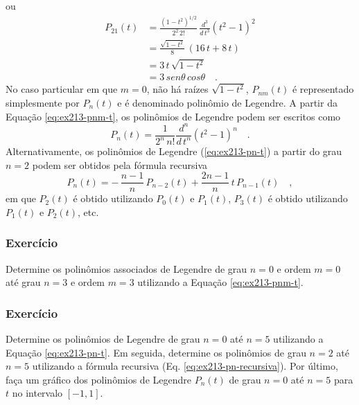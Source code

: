 \documentclass[10pt,a4paper,fleqn]{article}
\begin{document}
ou
\begin{equation}
\begin{split}
P_{21}(t) & = \frac{(1 - t^{2})^{1/2}}{2^{2} \, 2!} \, \frac{d^{3}}{d \, t^{3}}(t^{2} - 1)^{2} \\
& = \frac{\sqrt{1 - t^{2}}}{8} \, (16 \, t + 8 \, t) \\
& = 3 \, t \, \sqrt{1 - t^{2}} \\
& = 3 \, sen \theta \, cos \theta \quad .
\end{split}
\label{eq:ex213-p21-t}
\end{equation}
No caso particular em que $m = 0$, n\~{a}o h\'{a} ra\'{i}zes $\sqrt{1 - t^{2}}$, $P_{nm}(t)$ \'{e} representado 
simplesmente por $P_{n}(t)$ e \'{e} denominado polin\^{o}mio de Legendre. A partir da Equação \ref{eq:ex213-pnm-t}, 
os polin\^{o}mios de Legendre podem ser escritos como
\begin{equation}
P_{n}(t) = \frac{1}{2^{n} \, n!} \frac{d^{n}}{d \, t^{n}}(t^{2} - 1)^{n} \quad .
\label{eq:ex213-pn-t}
\end{equation}
Alternativamente, os polin\^{o}mios de Legendre (\ref{eq:ex213-pn-t}) a partir do grau $n = 2$ podem ser obtidos pela 
f\'{o}rmula recursiva
\begin{equation}
P_{n}(t) = - \, \frac{n - 1}{n} \, P_{n-2}(t) + \frac{2n - 1}{n} \, t \, P_{n-1}(t) \quad ,
\label{eq:ex213-pn-recursiva}
\end{equation}
em que $P_{2}(t)$ \'{e} obtido utilizando $P_{0}(t)$ e $P_{1}(t)$, $P_{3}(t)$ \'{e} obtido utilizando $P_{1}(t)$ e $P_{2}(t)$, etc.

\begin{flushleft}
\dotfill
\end{flushleft}

\subsubsection{Exerc\'{i}cio}

Determine os polin\^{o}mios associados de Legendre de grau $n = 0$ e ordem $m = 0$ at\'{e} grau $n = 3$ 
e ordem $m = 3$ utilizando a Equação \ref{eq:ex213-pnm-t}.

\subsubsection{Exerc\'{i}cio}

Determine os polin\^{o}mios de Legendre de grau $n = 0$ at\'{e} $n = 5$ utilizando a Equação \ref{eq:ex213-pn-t}. Em seguida, determine os polin\^{o}mios de grau $n = 2$ at\'{e} $n = 5$ utilizando a f\'{o}rmula recursiva 
(Eq. \ref{eq:ex213-pn-recursiva}). Por último, faça um gr\'{a}fico dos polin\^{o}mios de Legendre $P_{n}(t)$ de grau 
$n = 0$ at\'{e} $n = 5$ para $t$ no intervalo $[-1,1]$. 
\end{document}
